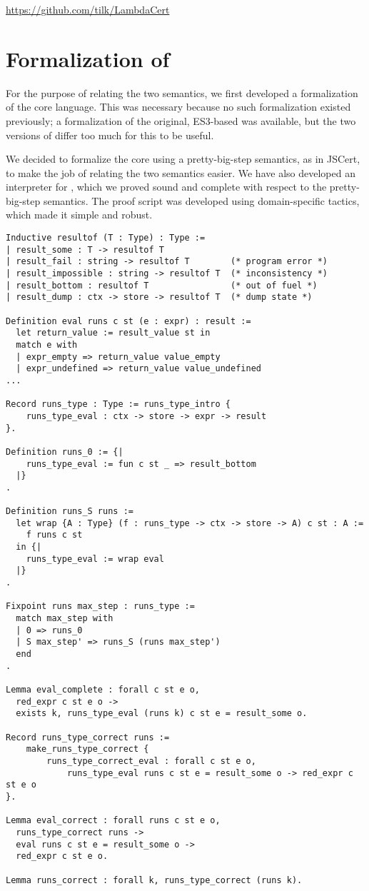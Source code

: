 \documentclass{llncs}
\newcommand{\asi}[1]{\todo[color=green,inline]{#1}}
\begin{document}
\url{https://github.com/tilk/LambdaCert}

\section{Formalization of \lambdajs}
\label{sec:form-lambdajs}

\asi{describe the changes to the language.}

For the purpose of relating the two semantics, we first developed a
formalization of the \lambdajs core language. This was necessary because no such
formalization existed previously; a formalization of the original, ES3-based
\lambdajs was available\cite{github:brownplt/LambdaJS}, but the two
versions of \lambdajs differ too much for this to be useful.

We decided to formalize the \lambdajs core using a
pretty-big-step semantics, as in JSCert, to make the job of
relating the two semantics easier. We have also developed
an interpreter for \lambdajs, which we proved sound and
complete with respect to the pretty-big-step semantics.
The proof script was developed using domain-specific tactics,
which made it simple and robust.

\begin{verbatim}
Inductive resultof (T : Type) : Type :=
| result_some : T -> resultof T
| result_fail : string -> resultof T        (* program error *)
| result_impossible : string -> resultof T  (* inconsistency *)
| result_bottom : resultof T                (* out of fuel *)
| result_dump : ctx -> store -> resultof T  (* dump state *)

Definition eval runs c st (e : expr) : result :=
  let return_value := result_value st in
  match e with
  | expr_empty => return_value value_empty
  | expr_undefined => return_value value_undefined
...

Record runs_type : Type := runs_type_intro {
    runs_type_eval : ctx -> store -> expr -> result
}.

Definition runs_0 := {|
    runs_type_eval := fun c st _ => result_bottom
  |}
.

Definition runs_S runs := 
  let wrap {A : Type} (f : runs_type -> ctx -> store -> A) c st : A :=
    f runs c st
  in {|
    runs_type_eval := wrap eval
  |}
.

Fixpoint runs max_step : runs_type :=
  match max_step with
  | 0 => runs_0
  | S max_step' => runs_S (runs max_step')
  end
.

Lemma eval_complete : forall c st e o,
  red_expr c st e o -> 
  exists k, runs_type_eval (runs k) c st e = result_some o.

Record runs_type_correct runs :=
    make_runs_type_correct {
        runs_type_correct_eval : forall c st e o,
            runs_type_eval runs c st e = result_some o -> red_expr c st e o
}.

Lemma eval_correct : forall runs c st e o,
  runs_type_correct runs -> 
  eval runs c st e = result_some o ->
  red_expr c st e o.

Lemma runs_correct : forall k, runs_type_correct (runs k). 
\end{verbatim}
\end{document}
